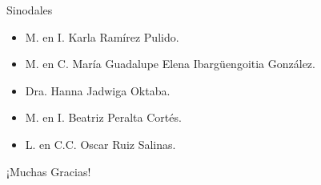 	\begin{frame}{Sinodales}
		\begin{itemize}
			\item M. en I. Karla Ramírez Pulido.
			\item M. en C. María Guadalupe Elena Ibargüengoitia González.
			\item Dra. Hanna Jadwiga Oktaba.
			\item M. en I. Beatriz Peralta Cortés.
			\item L. en C.C. Oscar Ruiz Salinas.
		\end{itemize}
	\end{frame}

	\begin{frame}
		\centering
		\huge{¡Muchas Gracias!}
	\end{frame}
